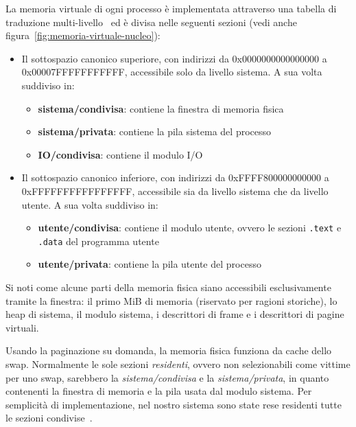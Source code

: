 La memoria virtuale di ogni processo è implementata attraverso una tabella di traduzione multi-livello~\cite{lettieri:tabelle-multilivello} ed è divisa nelle seguenti sezioni (vedi anche figura~\ref{fig:memoria-virtuale-nucleo}): 
\begin{itemize}
	\item Il sottospazio canonico superiore, con indirizzi da 0x0000000000000000 a \linebreak 0x00007FFFFFFFFFFF, accessibile solo da livello sistema. A sua volta suddiviso in:
	\begin{itemize}
		\item \textbf{sistema/condivisa}: contiene la finestra di memoria fisica
		\item \textbf{sistema/privata}: contiene la pila sistema del processo
		\item \textbf{IO/condivisa}: contiene il modulo I/O
	\end{itemize}
	\item Il sottospazio canonico inferiore, con indirizzi da 0xFFFF800000000000 a \linebreak 0xFFFFFFFFFFFFFFFF, accessibile sia da livello sistema che da livello utente. A sua volta suddiviso in:
	\begin{itemize}
		\item \textbf{utente/condivisa}: contiene il modulo utente, ovvero le sezioni \texttt{.text} e \texttt{.data} del programma utente
		\item \textbf{utente/privata}: contiene la pila utente del processo
	\end{itemize}
\end{itemize}
Si noti come alcune parti della memoria fisica siano accessibili esclusivamente tramite la finestra: il primo MiB di memoria (riservato per ragioni storiche), lo heap di sistema, il modulo sistema, i descrittori di frame e i descrittori di pagine virtuali.

Usando la paginazione su domanda, la memoria fisica funziona da cache dello swap. Normalmente le sole sezioni \emph{residenti}, ovvero non selezionabili come vittime per uno swap, sarebbero la \emph{sistema/condivisa} e la \emph{sistema/privata}, in quanto contenenti la finestra di memoria e la pila usata dal modulo sistema. Per semplicità di implementazione, nel nostro sistema sono state rese residenti tutte le sezioni condivise~\cite{lettieri:paginazione-nel-nucleo}.
